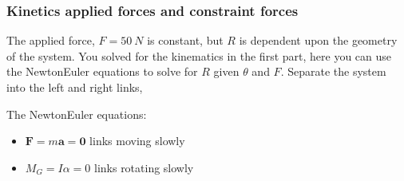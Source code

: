 \documentclass[letterpaper,10pt,english]{sphinxmanual}
\begin{document}
\begin{sphinxVerbatim}[commandchars=\\\{\}]
  
  
 
\end{sphinxVerbatim}

\noindent{}


\subsubsection{Kinetics \sphinxhyphen{} applied forces and constraint forces}
\label{\detokenize{module_01/mechanical-advantage:kinetics-applied-forces-and-constraint-forces}}
The applied force, \(F=50~N\) is constant, but \(R\) is dependent upon the
geometry of the system. You solved for the kinematics in the first part,
here you can use the Newton\sphinxhyphen{}Euler equations to solve for \(R\) given \(\theta\) and
\(F\). Separate the system into the left and right links,


The Newton\sphinxhyphen{}Euler equations:
\begin{itemize}
\item {} 
\(\mathbf{F} = m\mathbf{a} = \mathbf{0}\) links moving slowly

\item {} 
\(M_G = I\alpha = 0\) links rotating slowly

\end{itemize}
\end{document}
